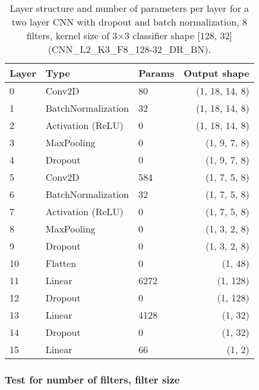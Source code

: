 \begin{table}[h]
\centering
\begin{tabular}{lllr}
\hline
\textbf{Layer} & \textbf{Type}  & \textbf{Params} & \textbf{Output shape} \\
\hline
0     & Conv2D                      & 80     & (1, 18, 14, 8) \\
1     & BatchNormalization        & 32     & (1, 18, 14, 8) \\
2     & Activation (ReLU)           & 0      & (1, 18, 14, 8) \\
3     & MaxPooling                  & 0      & (1, 9, 7, 8)   \\
4     & Dropout                     & 0      & (1, 9, 7, 8)   \\
5     & Conv2D                      & 584    & (1, 7, 5, 8)   \\
6     & BatchNormalization        & 32     & (1, 7, 5, 8)   \\
7     & Activation (ReLU)           & 0      & (1, 7, 5, 8)   \\
8     & MaxPooling                  & 0      & (1, 3, 2, 8)   \\
9     & Dropout                     & 0      & (1, 3, 2, 8)   \\
10    & Flatten                     & 0      & (1, 48)        \\
11    & Linear                      & 6272   & (1, 128)       \\
12    & Dropout                     & 0      & (1, 128)       \\
13    & Linear                      & 4128   & (1, 32)        \\
14    & Dropout                     & 0      & (1, 32)        \\
15    & Linear                      & 66     & (1, 2)        \\ 
\hline
\end{tabular}
\caption{Layer structure and number of parameters per layer for a two layer CNN with dropout and batch normalization, 8 filters, kernel size of 3$\times$3 classifier shape [128, 32] (CNN\_L2\_K3\_F8\_128-32\_DR\_BN). }
\end{table}




\subsubsection{Test for number of filters, filter size}



